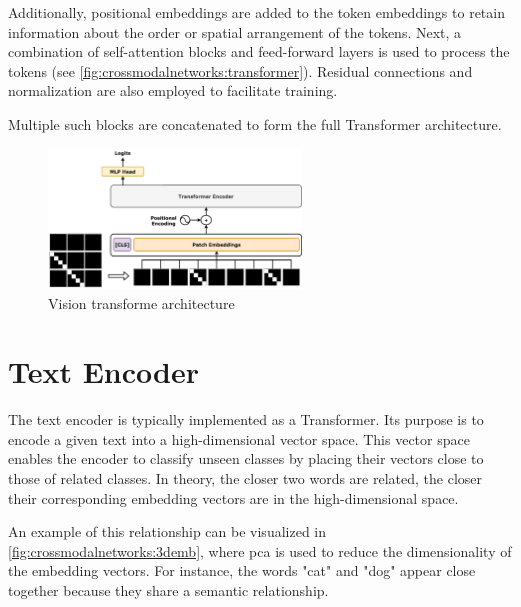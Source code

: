     Additionally, positional embeddings are added to the token embeddings to retain information about the order or spatial arrangement of the tokens. 
    Next, a combination of self-attention blocks and feed-forward layers is used to process the tokens (see \cref{fig:crossmodalnetworks:transformer}). 
    Residual connections and normalization are also employed to facilitate training.

    Multiple such blocks are concatenated to form the full Transformer architecture.


    \begin{figure}[]
        \centering
        \includegraphics[width=0.6\textwidth]{Images/crossmodalnetworks/Vision_Transformer.png}
        \caption{Vision transforme architecture\cite{vitwikipedia}}
        \label{fig:crossmodalnetworks:visiontransformer}
    \end{figure}

    \section{Text Encoder}

    The text encoder is typically implemented as a Transformer. 
    Its purpose is to encode a given text into a high-dimensional vector space. 
    This vector space enables the encoder to classify unseen classes by placing their vectors close to those of related classes. 
    In theory, the closer two words are related, the closer their corresponding embedding vectors are in the high-dimensional space.

    An example of this relationship can be visualized in \cref{fig:crossmodalnetworks:3demb}, where \acrfull{pca} is used to reduce the dimensionality of the embedding vectors. 
    For instance, the words "cat" and "dog" appear close together because they share a semantic relationship.


